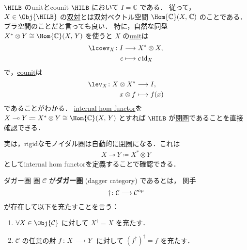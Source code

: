 \documentclass[TQFT_main]{subfiles}
\begin{document}
\begin{myexample}[label=ex:Hilb-closed]{$\HILB$ のunitとcounit}
    $\HILB$ において $I = \mathbb{C}$ である． 
    従って，$X \in \Obj{\HILB}$ の\hyperref[def:dual]{双対}とは双対ベクトル空間 $\Hom{\mathbb{C}} (X,\, \mathbb{C})$ のことである．ブラ空間のことだと言っても良い．
    特に，自然な同型 $X^* \otimes Y \cong \Hom{\mathbb{C}} (X,\, Y)$ を使うと
    $X$ の\hyperref[def:dual]{unit}は
    \begin{align}
        \lcoev_X \colon I &\lto X^* \otimes X, \\
        c &\lmto c\, \mathrm{id}_X
    \end{align}
    で，\hyperref[def:dual]{counit}は
    \begin{align}
        \lev_X \colon X \otimes X^* &\lto I, \\
        x \otimes f &\lmto f(x)
    \end{align}
    であることがわかる．
    \hyperref[def:closed-monoidal]{internal hom functor}を $X \multimap Y \coloneqq X^* \otimes Y \cong \Hom{\mathbb{C}}(X,\, Y)$ とすれば $\HILB$ が\hyperref[def:closed-monoidal]{閉圏}であることを直接確認できる．
\end{myexample}

実は，rigidなモノイダル圏は自動的に\hyperref[def:closed-monoidal]{閉圏}になる．これは
\begin{align}
    X \multimap Y \coloneqq X^* \otimes Y
\end{align}
としてinternal hom functorを定義することで確認できる．


\begin{mydef}[label=def:dagger-monoidal]{ダガー圏}
    圏 $\mathcal{C}$ が\textbf{ダガー圏} (dagger category) であるとは，
    関手
    \begin{align}
        \dagger \colon \mathcal{C} \longrightarrow \mathcal{C}^{\mathrm{op}}
    \end{align}
    が存在して以下を充たすことを言う：
    \begin{enumerate}
        \item $\forall X \in \Obj{\mathcal{C}}$ に対して $X^\dagger = X$ を充たす．
        \item $\mathcal{C}$ の任意の射 $f \colon X \longrightarrow Y$ に対して $(f^\dagger)^\dagger = f$ を充たす．
    \end{enumerate}
\end{mydef}
\end{document}
